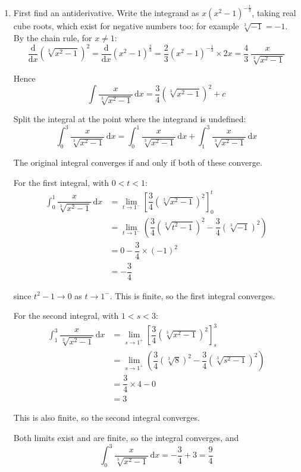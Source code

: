 \documentclass[leqno]{article}
\begin{document}
\begin{enumerate}[
  label=\textbf{\arabic*.},
  leftmargin=*,
  topsep=0pt,
  partopsep=0pt,
  parsep=0pt
]
\begin{djsSolution}
\begin{enumerate}[label=\textbf{(\alph*)}, start=1]
  \item First find an antiderivative. Write the integrand as \(x\left(x^2-1\right)^{-\frac13}\), taking real cube roots, which exist for negative numbers too: for example \(\sqrt[3]{-1}=-1\). By the chain rule, for \(x\neq 1\):
\[
\frac{\mathrm{d}}{\mathrm{d}x}\left(\sqrt[3]{x^2-1}\right)^2=\frac{\mathrm{d}}{\mathrm{d}x}\left(x^2-1\right)^{\frac23}=\dfrac23\left(x^2-1\right)^{-\frac13}\times 2x=\dfrac43\,\dfrac{x}{\sqrt[3]{x^2-1}}
\]

Hence
\[
\int \dfrac{x}{\sqrt[3]{x^2-1}}\,\mathrm{d}x=\dfrac34\left(\sqrt[3]{x^2-1}\right)^2+c
\]

Split the integral at the point where the integrand is undefined:
\[
\int_0^3 \dfrac{x}{\sqrt[3]{x^2-1}}\,\mathrm{d}x=\int_0^1 \dfrac{x}{\sqrt[3]{x^2-1}}\,\mathrm{d}x+\int_1^3 \dfrac{x}{\sqrt[3]{x^2-1}}\,\mathrm{d}x
\]

The original integral converges if and only if both of these converge.

For the first integral, with \(0<t<1\):
\begin{align*}
\int_0^1 \dfrac{x}{\sqrt[3]{x^2-1}}\,\mathrm{d}x&=\lim_{t\to 1^-}\left[\dfrac34\left(\sqrt[3]{x^2-1}\right)^2\right]_0^t\\
&=\lim_{t\to 1^-}\left(\dfrac34\left(\sqrt[3]{t^2-1}\right)^2-\dfrac34\left(\sqrt[3]{-1}\right)^2\right)\\
&=0-\dfrac34\times(-1)^2\\
&=-\dfrac34
\end{align*}

since \(t^2-1\to 0\) as \(t\to1^-\). This is finite, so the first integral converges.

For the second integral, with \(1<s<3\):
\begin{align*}
\int_1^3 \dfrac{x}{\sqrt[3]{x^2-1}}\,\mathrm{d}x&=\lim_{s\to 1^+}\left[\dfrac34\left(\sqrt[3]{x^2-1}\right)^2\right]_s^3\\
&=\lim_{s\to 1^+}\left(\dfrac34\left(\sqrt[3]{8}\right)^2-\dfrac34\left(\sqrt[3]{s^2-1}\right)^2\right)\\
&=\dfrac34\times 4-0\\
&=3
\end{align*}

This is also finite, so the second integral converges.

Both limits exist and are finite, so the integral converges, and
\[
\int_0^3 \dfrac{x}{\sqrt[3]{x^2-1}}\,\mathrm{d}x=-\dfrac34+3=\dfrac94
\]

\end{enumerate}
\end{djsSolution}


\end{enumerate}
\end{document}
